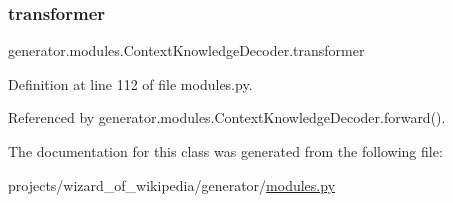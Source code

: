 \subsubsection{\texorpdfstring{transformer}{transformer}}
{\footnotesize\ttfamily generator.\+modules.\+Context\+Knowledge\+Decoder.\+transformer}



Definition at line 112 of file modules.\+py.



Referenced by generator.\+modules.\+Context\+Knowledge\+Decoder.\+forward().



The documentation for this class was generated from the following file\+:\begin{DoxyCompactItemize}
\item 
projects/wizard\+\_\+of\+\_\+wikipedia/generator/\hyperlink{projects_2wizard__of__wikipedia_2generator_2modules_8py}{modules.\+py}\end{DoxyCompactItemize}
